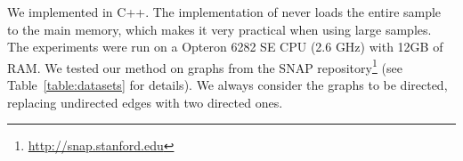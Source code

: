 \begin{table}[ht]
\centering
{}
\caption{\scriptsize The datasets, corresponding statistics, and the rate of generating new items at each step.}\label{table:datasets}
\end{table}

 We implemented \algonameapx in C++. The implementation of \algonameapx never loads the entire sample
to the main memory, which makes it very practical when using large samples. The
experiments were run on a Opteron 6282 SE CPU (2.6 GHz) with 12GB of RAM. We
tested our method on graphs from the SNAP
repository\footnote{\url{http://snap.stanford.edu}} (see
Table~\ref{table:datasets} for details). We always consider the graphs to be
directed, replacing undirected edges with two directed ones.

